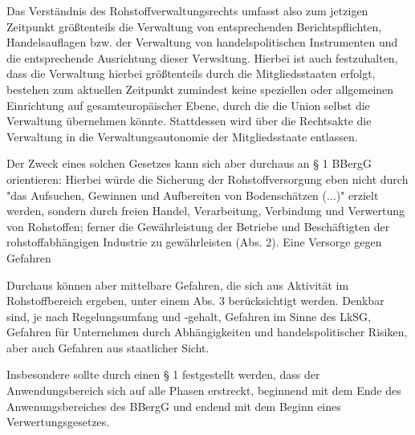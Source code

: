 \documentclass[12pt,a4paper,oneside]{book} %
\begin{document}
Das Verständnis des Rohstoffverwaltungsrechts umfasst also zum jetzigen Zeitpunkt größtenteils die Verwaltung von entsprechenden Berichtspflichten, Handelsauflagen bzw. der Verwaltung von handelspolitischen Instrumenten und die entsprechende Ausrichtung dieser Verwsltung. Hierbei ist auch festzuhalten, dass die Verwaltung hierbei größtenteils durch die Mitgliedsstaaten erfolgt, bestehen zum aktuellen Zeitpunkt zumindest keine speziellen oder allgemeinen Einrichtung auf gesamteuropäischer Ebene, durch die die Union selbst die Verwaltung übernehmen könnte. Stattdessen wird über die Rechtsakte die Verwaltung in die Verwaltungsautonomie der Mitgliedsstaate entlassen.


Der Zweck eines solchen Gesetzes kann sich aber durchaus an § 1 BBergG orientieren: Hierbei würde die Sicherung der Rohstoffversorgung eben nicht durch "das Aufsuchen, Gewinnen und Aufbereiten von Bodenschätzen (...)" erzielt werden, sondern durch freien Handel, Verarbeitung, Verbindung und Verwertung von Rohstoffen; ferner die Gewährleistung der Betriebe und Beschäftigten der rohstoffabhängigen Industrie zu gewährleisten (Abs. 2). Eine Versorge gegen Gefahren

Durchaus können aber mittelbare Gefahren, die sich aus Aktivität im Rohstoffbereich ergeben, unter einem Abs. 3 berücksichtigt werden. Denkbar sind, je nach Regelungsumfang und -gehalt, Gefahren im Sinne des LkSG, Gefahren für Unternehmen durch Abhängigkeiten und handelspolitischer Risiken, aber auch Gefahren aus staatlicher Sicht.

Insbesondere sollte durch einen § 1 festgestellt werden, dass der Anwendungsbereich sich auf alle Phasen erstreckt, beginnend mit dem Ende des Anwenungsbereiches des BBergG und endend mit dem Beginn eines Verwertungsgesetzes.
\end{document}
